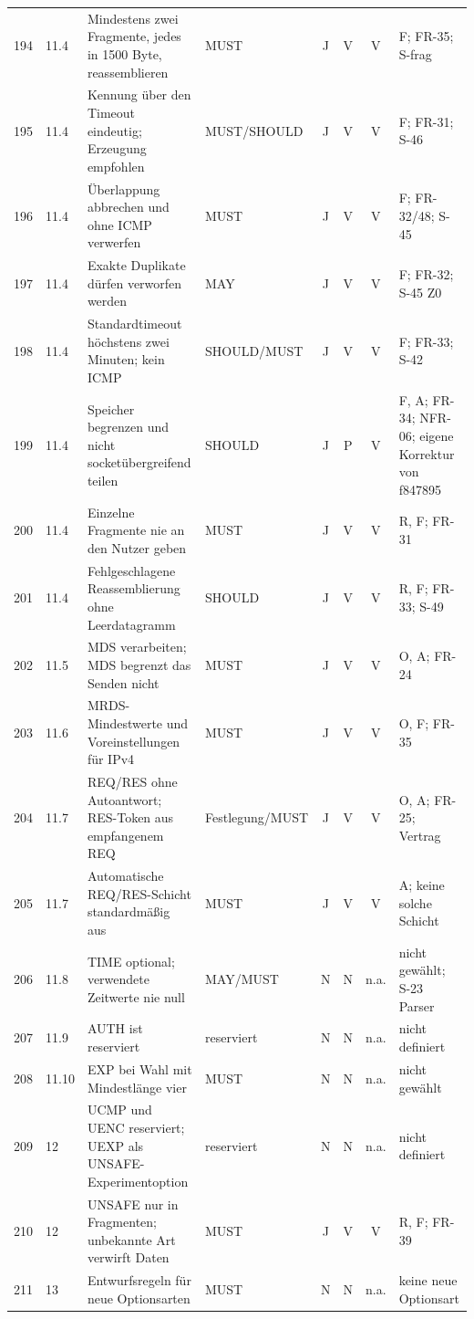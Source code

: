 \begin{longtable}{@{}r l L{4.45cm} L{2.00cm} c c c L{4.20cm}@{}}
194 & 11.4 & Mindestens zwei Fragmente, jedes in 1500 Byte, reassemblieren & MUST & J & V & V & F; FR-35; S-frag \\
195 & 11.4 & Kennung über den Timeout eindeutig; Erzeugung empfohlen & MUST\slash SHOULD & J & V & V & F; FR-31; S-46 \\
196 & 11.4 & Überlappung abbrechen und ohne ICMP verwerfen & MUST & J & V & V & F; FR-32/48; S-45 \\
197 & 11.4 & Exakte Duplikate dürfen verworfen werden & MAY & J & V & V & F; FR-32; S-45 Z0 \\
198 & 11.4 & Standardtimeout höchstens zwei Minuten; kein ICMP & SHOULD\slash MUST & J & V & V & F; FR-33; S-42 \\
199 & 11.4 & Speicher begrenzen und nicht socketübergreifend teilen & SHOULD & J & P & V &
  F, A; FR-34; NFR-06; eigene Korrektur von f847895 \\
200 & 11.4 & Einzelne Fragmente nie an den Nutzer geben & MUST & J & V & V & R, F; FR-31 \\
201 & 11.4 & Fehlgeschlagene Reassemblierung ohne Leerdatagramm & SHOULD & J & V & V & R, F; FR-33; S-49 \\
202 & 11.5 & MDS verarbeiten; MDS begrenzt das Senden nicht & MUST & J & V & V & O, A; FR-24 \\
203 & 11.6 & MRDS-Mindestwerte und Voreinstellungen für IPv4 & MUST & J & V & V & O, F; FR-35 \\
204 & 11.7 & REQ/RES ohne Autoantwort; RES-Token aus empfangenem REQ & Festlegung\slash MUST & J & V & V &
  O, A; FR-25; Vertrag \\
205 & 11.7 & Automatische REQ/RES-Schicht standardmäßig aus & MUST & J & V & V & A; keine solche Schicht \\
206 & 11.8 & TIME optional; verwendete Zeitwerte nie null & MAY\slash MUST & N & N & n.a. &
  nicht gewählt; S-23 Parser \\
207 & 11.9 & AUTH ist reserviert & reserviert & N & N & n.a. & nicht definiert \\
208 & 11.10 & EXP bei Wahl mit Mindestlänge vier & MUST & N & N & n.a. & nicht gewählt \\
209 & 12 & UCMP und UENC reserviert; UEXP als UNSAFE-Experimentoption & reserviert & N & N & n.a. & nicht definiert \\
210 & 12 & UNSAFE nur in Fragmenten; unbekannte Art verwirft Daten & MUST & J & V & V & R, F; FR-39 \\
211 & 13 & Entwurfsregeln für neue Optionsarten & MUST & N & N & n.a. & keine neue Optionsart \\

\end{longtable}

